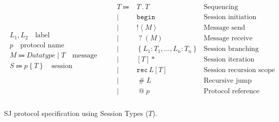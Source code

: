 \documentclass[10pt]{llncs}
\begin{document}
\begin{figure}
\begin{gather*}
\begin{array}{c}
L_1, L_2\quad\mbox{label}
\\[10pt]
p\quad\mbox{protocol name}
\\[10pt]
M \Coloneqq \textit{Datatype} \mid T \quad\mbox{message}
\\[10pt]
S \Coloneqq  p\left\{ T \right\} \quad \mbox{session}
\end{array}
\qquad
\begin{array}{rlr}
T \Coloneqq & T\mathbin{.}T & \mbox{Sequencing} \\ 
       \mid & \texttt{begin} & \mbox{Session initiation} \\
       \mid & \mathopen{!}\left<M\right> & \mbox{Message send} \\ 
       \mid & \mathopen{?}\left(M\right) & \mbox{Message receive} \\
       \mid & \left\{L_1 \colon T_1,\dots, L_n \colon T_n \right\} & \mbox{Session branching} \\ %
       \mid & \left[T\right]* & \mbox{Session iteration} \\ 
       \mid & \texttt{rec}\,L\left[T\right] & \mbox{Session recursion scope} \\ 
       \mid & \mathopen{\#}L & \mbox{Recursive jump} \\ 
       \mid & \mathopen{@}p & \mbox{Protocol reference} \\
\end{array}
\end{gather*}
\caption{SJ protocol specification using Session Types ($T$).}\label{tab:prot-spec} 
\end{figure}

\end{document}
